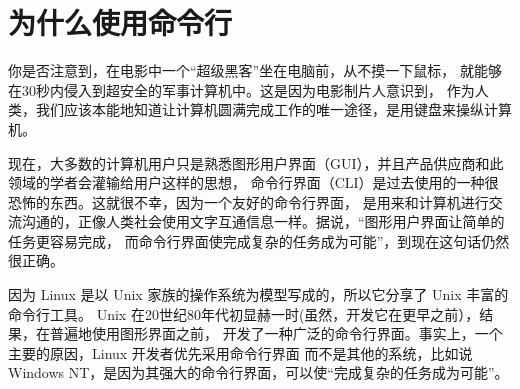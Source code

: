 \section{为什么使用命令行}
\label{为什么使用命令行}

你是否注意到，在电影中一个“超级黑客”坐在电脑前，从不摸一下鼠标， 就能够在30秒内侵入到超安全的军事计算机中。这是因为电影制片人意识到， 作为人类，我们应该本能地知道让计算机圆满完成工作的唯一途径，是用键盘来操纵计算机。

\par 现在，大多数的计算机用户只是熟悉图形用户界面（GUI），并且产品供应商和此领域的学者会灌输给用户这样的思想， 命令行界面（CLI）是过去使用的一种很恐怖的东西。这就很不幸，因为一个友好的命令行界面， 是用来和计算机进行交流沟通的，正像人类社会使用文字互通信息一样。据说，“图形用户界面让简单的任务更容易完成， 而命令行界面使完成复杂的任务成为可能”，到现在这句话仍然很正确。

\par 因为 Linux 是以 Unix 家族的操作系统为模型写成的，所以它分享了 Unix 丰富的命令行工具。 Unix 在20世纪80年代初显赫一时(虽然，开发它在更早之前），结果，在普遍地使用图形界面之前， 开发了一种广泛的命令行界面。事实上，一个主要的原因，Linux 开发者优先采用命令行界面 而不是其他的系统，比如说 Windows NT，是因为其强大的命令行界面，可以使“完成复杂的任务成为可能”。

